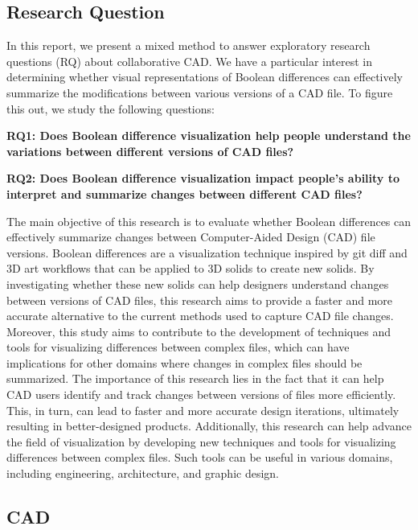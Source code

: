 \documentclass[sigconf,authorversion,nonacm]{acmart}
\begin{document}
\subsection{Research Question}
In this report, we present a mixed method to answer exploratory research questions (RQ) about collaborative CAD. 
We have a particular interest in determining whether visual representations of Boolean differences can effectively summarize the modifications between various versions of a CAD file. 
To figure this out, we study the following questions:

\textbf{RQ1: Does Boolean difference visualization help people understand the variations between different versions of CAD files?}

\textbf{RQ2: Does Boolean difference visualization impact people's ability to interpret and summarize changes between different CAD files?}

The main objective of this research is to evaluate whether Boolean differences can effectively summarize changes between Computer-Aided Design (CAD) file versions. 
Boolean differences are a visualization technique inspired by git diff and 3D art workflows that can be applied to 3D solids to create new solids. 
By investigating whether these new solids can help designers understand changes between versions of CAD files, this research aims to provide a faster and more accurate alternative to the current methods used to capture CAD file changes. 
Moreover, this study aims to contribute to the development of techniques and tools for visualizing differences between complex files, which can have implications for other domains where changes in complex files should be summarized. 
The importance of this research lies in the fact that it can help CAD users identify and track changes between versions of files more efficiently. 
This, in turn, can lead to faster and more accurate design iterations, ultimately resulting in better-designed products. 
Additionally, this research can help advance the field of visualization by developing new techniques and tools for visualizing differences between complex files. 
Such tools can be useful in various domains, including engineering, architecture, and graphic design. 
\subsection{CAD}
\end{document}

